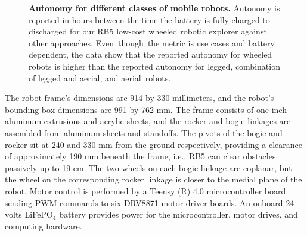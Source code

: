 \documentclass[letterpaper,10pt,conference,twoside]{IEEEtran}
\theoremstyle{definition}
\begin{document}
\begin{figure}[t]
  \vspace*{-.45cm}
  \begin{minipage}[t]{0.59\columnwidth}
    \hspace*{-.5cm}
    
  \end{minipage}\hfill
  \begin{minipage}[t]{0.4\columnwidth}
    \vspace*{-5.1cm}
    \centering
    \caption{%
    \textbf{Autonomy for different classes of mobile robots. }
    Autonomy is reported in hours between the time the battery is fully charged to discharged for our RB5 low-cost wheeled robotic explorer against other approaches. Even~though~the metric is use cases and battery dependent, the data show that the reported autonomy for wheeled robots is higher than the reported autonomy for legged, combination of legged and aerial, and aerial~robots.
    }
    \label{fig}
  \end{minipage}
  \vspace*{-1.2cm}
\end{figure}

The robot frame's dimensions are 914 by 330 millimeters, and the robot's bounding box dimensions are 991 by 762 mm. The frame consists of one inch aluminum extrusions and acrylic sheets, and the rocker and bogie linkages are assembled from aluminum sheets and standoffs. The pivots of the bogie and rocker sit at 240 and 330 mm from the ground respectively, providing a clearance of approximately 190 mm beneath the frame, i.e., RB5 can clear obstacles passively up to 19 cm. The two wheels on each bogie linkage are coplanar, but the wheel on the corresponding rocker linkage is closer to the medial plane of the robot. Motor control is performed by a Teensy (R) 4.0 microcontroller board sending PWM commands to six DRV8871 motor driver boards. An onboard 24 volts LiFePO${}_\text{4}$ battery provides power for the microcontroller, motor drives, and computing hardware.
\end{document}
